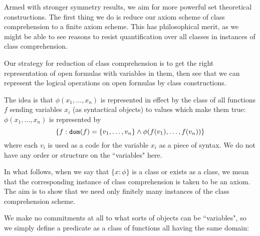 \documentclass[12pt]{article}
\begin{document}
Armed with stronger symmetry results, we aim for more powerful set theoretical constructions.  The first thing we do is reduce our 
axiom scheme of class comprehension to a finite axiom scheme.  This has philosophical merit, as we might be able to see reasons to resist
quantification over all classes in instances of class comprehension.

Our strategy for reduction of class comprehension is to get the right representation of open formulas with variables in them, then see that we can represent the logical operations on open formulas by class constructions.

The idea is that $\phi(x_1,\ldots,x_n)$ is represented in effect by the class of all functions $f$ sending variables $x_i$ (as syntactical objects) to values which make them true:  $\phi(x_1,\ldots,x_n)$ is represented by
$$\{f:{\tt dom}(f)=\{v_1,\ldots,v_n\} \wedge \phi(f(v_1),\ldots,f(v_n))\}$$ where each $v_i$ is used as a code for the variable $x_i$ as a piece of syntax.  We do not have any order or structure on the ``variables" here.

In what follows, when we say that $\{x:\phi\}$ is a class or exists as a class, we mean that the corresponding instance of class comprehension is taken to be an axiom.  The aim is to show that we need only finitely many instances of the class comprehension scheme.

We make no commitments at all to what sorts of objects can be ``variables", so we simply define a predicate as a class of functions all having the same domain:
\end{document}
